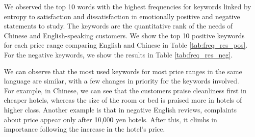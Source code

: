 \documentclass[smallextended,natbib]{svjour3}       %
\providecommand{\DIFdelend}{} %
\DeclareRobustCommand{\DIFdelend}{\DIFOaddend \let\includegraphics\DIFOincludegraphics} %
\begin{document}
\DIFdelend We observed the top 10 words with the highest frequencies for keywords linked by entropy to satisfaction and dissatisfaction in emotionally positive and negative statements to study. The keywords are the quantitative rank of the needs of Chinese and English-speaking customers. We show the top 10 positive keywords for each price range comparing English and Chinese in Table \ref{tab:freq_res_pos}. For the negative keywords, we show the results in Table \ref{tab:freq_res_neg}.

    We can observe that the most used keywords for most price ranges in the same language are similar, with a few changes in priority for the keywords involved. For example, in Chinese, we can see that the customers praise cleanliness first in cheaper hotels, whereas the size of the room or bed is praised more in hotels of higher class. Another example is that in negative English reviews, complaints about price appear only after 10,000 yen hotels. After this, it climbs in importance following the increase in the hotel's price.
\end{document}
